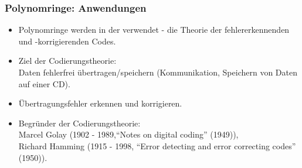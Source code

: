 %	
%
%	
%	
%
\begin{frame}\frametitle{Polynomringe: Anwendungen}
	
	\begin{itemize}
		\item Polynomringe werden in der  verwendet - die Theorie der fehlererkennenden und -korrigierenden Codes. 
		\item Ziel der Codierungstheorie:\\ 
			Daten fehlerfrei \"ubertragen/speichern (Kommunikation, Speichern von Daten auf einer CD).
		\item \"Ubertragungsfehler erkennen und korrigieren.
		\item Begr\"under der Codierungstheorie:\\ 
			Marcel Golay  (1902 - 1989,``Notes on digital coding'' (1949)), \\
			Richard Hamming (1915 - 1998, ``Error detecting and error correcting codes'' (1950)).
	\end{itemize}
	
\end{frame}
%
